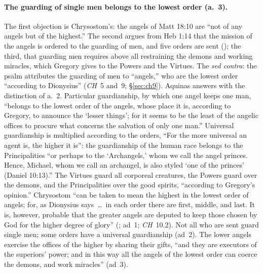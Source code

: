 \paragraph{The guarding of single men belongs to the lowest order (a.~3).}
The first objection is Chrysostom's: the angels of Matt 18:10 are ``not of
any angels but of the highest.'' The second argues from Heb 1:14 that the
mission of the angels is ordered to the guarding of men, and five orders are
sent (); the third, that guarding men requires above all
restraining the demons and working miracles, which Gregory gives to the
Powers and the Virtues. The \emph{sed contra}: the psalm attributes the
guarding of men to ``angels,'' who are the lowest order ``according to
Dionysius'' (\emph{CH}~5 and~9; \S\ref{sec:ch9}). Aquinas answers with the
distinction of a.~2. Particular guardianship, by which one angel keeps one
man, ``belongs to the lowest order of the angels, whose place it is,
according to Gregory, to announce the `lesser things'; for it seems to be
the least of the angelic offices to procure what concerns the salvation of
only one man.'' Universal guardianship is multiplied according to the
orders, ``For the more universal an agent is, the higher it is'': the
guardianship of the human race belongs to the Principalities ``or perhaps
to the `Archangels,' whom we call the angel princes. Hence, Michael, whom we
call an archangel, is also styled `one of the princes' (Daniel 10:13).'' The
Virtues guard all corporeal creatures, the Powers guard over the demons, and
the Principalities over the good spirits, ``according to Gregory's
opinion.'' Chrysostom ``can be taken to mean the highest in the lowest order
of angels; for, as Dionysius says~\dots\ in each order there are first,
middle, and last. It is, however, probable that the greater angels are
deputed to keep those chosen by God for the higher degree of glory''
(; ad~1; \emph{CH}~10.2). Not all who are sent guard single men; some orders have a universal
guardianship (ad~2). The lower angels exercise the offices of the higher by
sharing their gifts, ``and they are executors of the superiors' power; and
in this way all the angels of the lowest order can coerce the demons, and
work miracles'' (ad~3).

